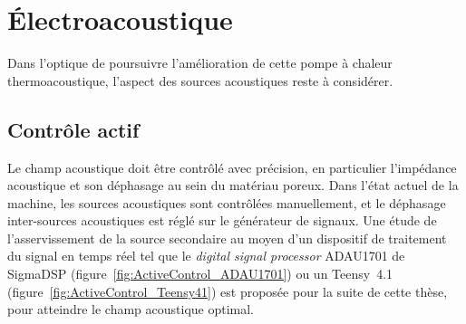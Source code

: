 \section{\'Electroacoustique}

Dans l'optique de poursuivre l'amélioration de cette pompe à chaleur thermoacoustique, l'aspect des sources acoustiques reste à considérer.

\subsection{Contrôle actif}
Le champ acoustique doit être contrôlé avec précision, en particulier l'impédance acoustique et son déphasage au sein du matériau poreux. Dans l'état actuel de la machine, les sources acoustiques sont contrôlées manuellement, et le déphasage inter-sources acoustiques est réglé sur le générateur de signaux. Une étude de l'asservissement de la source secondaire au moyen d'un dispositif de traitement du signal en temps réel tel que le \textit{digital signal processor} ADAU1701 de SigmaDSP (figure~\ref{fig:ActiveControl_ADAU1701}) ou un Teensy~4.1 (figure~\ref{fig:ActiveControl_Teensy41}) est proposée pour la suite de cette thèse, pour atteindre le champ acoustique optimal.



